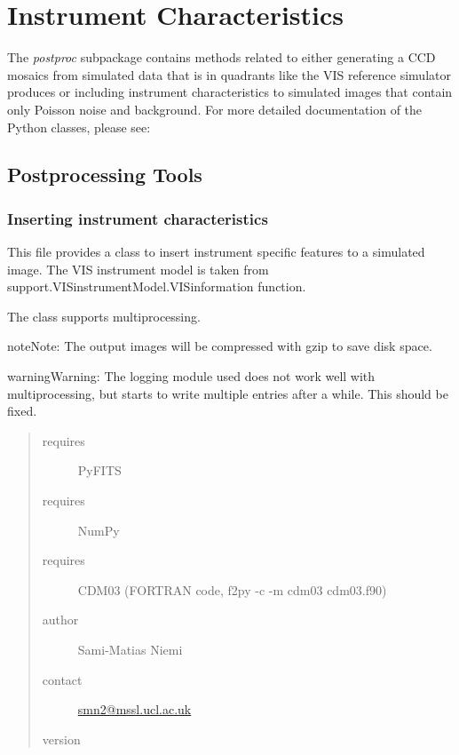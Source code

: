 \documentclass[a4paper,12pt,english]{sphinxmanual}
\begin{document}
\section{Instrument Characteristics}
\label{index:instrument-characteristics}
The \emph{postproc} subpackage contains methods related to either generating a CCD mosaics from simulated data
that is in quadrants like the VIS reference simulator produces or including instrument characteristics
to simulated images that contain only Poisson noise and background. For more detailed documentation
of the Python classes, please see:


\subsection{Postprocessing Tools}
\label{postproc:postprocessing-tools}\label{postproc::doc}\label{postproc:module-postproc.postprocessing}

\subsubsection{Inserting instrument characteristics}
\label{postproc:inserting-instrument-characteristics}
This file provides a class to insert instrument specific features to a simulated image. The VIS instrument
model is taken from support.VISinstrumentModel.VISinformation function.

The class supports multiprocessing.

\begin{notice}{note}{Note:}
The output images will be compressed with gzip to save disk space.
\end{notice}

\begin{notice}{warning}{Warning:}
The logging module used does not work well with multiprocessing, but
starts to write multiple entries after a while. This should be fixed.
\end{notice}
\begin{quote}\begin{description}
\item[{requires}] \leavevmode
PyFITS

\item[{requires}] \leavevmode
NumPy

\item[{requires}] \leavevmode
CDM03 (FORTRAN code, f2py -c -m cdm03 cdm03.f90)

\item[{author}] \leavevmode
Sami-Matias Niemi

\item[{contact}] \leavevmode
\href{mailto:smn2@mssl.ucl.ac.uk}{smn2@mssl.ucl.ac.uk}

\item[{version}] 

\end{description}\end{quote}
\end{document}
